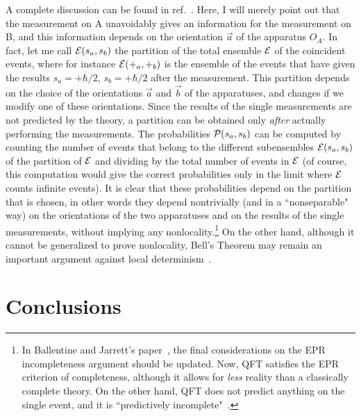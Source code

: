 \documentclass[published]{JHEP3}
\begin{document}
A complete discussion can be found in ref.~\cite{BaJa87}. Here, I will
merely point out that the measurement on A unavoidably gives an
information for the measurement on B, and this information depends on
the orientation $\vec a$ of the apparatus $O_A$. In fact, let me call
${\cal E}(s_a,s_b)$ the partition of the total ensemble ${\cal E}$ of
the coincident events, where for instance ${\cal E}(+_a,+_b)$ is the
ensemble of the events that have given the results $s_a=+\hbar/2$,
$s_b=+\hbar/2$ after the measurement.  This partition depends on the
choice of the orientations $\vec a$ and $\vec b$ of the apparatuses,
and changes if we modify one of these orientations. Since the results
of the single measurements are not predicted by the theory, a
partition can be obtained only \emph{after} actually performing the
measurements. The probabilities ${\cal P}(s_a,s_b)$ can be computed by
counting the number of events that belong to the different
subensembles ${\cal E}(s_a,s_b)$ of the partition of ${\cal E}$ and
dividing by the total number of events in ${\cal E}$ (of course, this
computation would give the correct probabilities only in the limit
where ${\cal E}$ counts infinite events). It is clear that these
probabilities depend on the partition that is chosen, in other words
they depend nontrivially (and in a ``nonseparable" way) on the
orientations of the two apparatuses and on the results of the single
measurements, without implying any nonlocality.\footnote{In Ballentine
and Jarrett's paper~\cite{BaJa87}, the final considerations on the EPR
incompleteness argument should be updated. Now, QFT satisfies the EPR
criterion of completeness, although it allows for \emph{less} reality
than a classically complete theory. On the other hand, QFT does not
predict anything on the single event, and it is ``predictively
incomplete"~\cite{BaJa87}.} On the other hand, although it cannot be
generalized to prove nonlocality, Bell's Theorem may remain an
important argument against local determinism~\cite{BaJa87}.


\section{Conclusions} 
\end{document}

